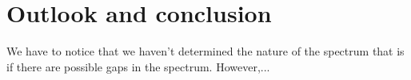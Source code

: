 \chapter{Outlook and conclusion}	 \label{chap:8}
	
	
We have to notice that we haven't determined the nature of the spectrum that is if there are possible gaps in the spectrum. However,... 
~\\ ~\\

